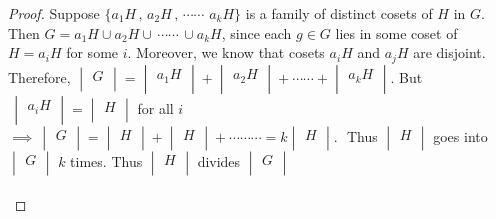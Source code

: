 \documentclass[11pt,a4paper]{article}
\theoremstyle{definition}
\begin{document}
\begin{proof}
Suppose $\{a_1H\, , \, a_2H\, , \, \cdots\cdots\, \, a_kH\}$ is a family of distinct cosets of $H$ in $G$. Then $G = a_1H\cup a_2H \cup\, \cdots\cdots\, \cup a_kH$, since each $g\in G$ lies in some coset of $H = a_iH$ for some $i$. Moreover, we know that cosets $a_i H$ and $a_jH$ are disjoint. Therefore, $\begin{vmatrix}
G\\
\end{vmatrix} = \begin{vmatrix}
a_1 H\\
\end{vmatrix} + \begin{vmatrix}
a_2 H\\
\end{vmatrix} + \cdots\cdots + \begin{vmatrix}
a_k H\\
\end{vmatrix}$. But $\, \begin{vmatrix}
a_i H\\
\end{vmatrix} = \begin{vmatrix}
H\\
\end{vmatrix}$ for all $i$
$\implies \, \begin{vmatrix}
G\\
\end{vmatrix} = \begin{vmatrix}
H\\
\end{vmatrix} + \begin{vmatrix}
H\\
\end{vmatrix} + \cdots\cdots\cdots  = k \begin{vmatrix}
H\\
\end{vmatrix}.\,\,$
Thus $\begin{vmatrix}
H\\
\end{vmatrix}$ goes into $\begin{vmatrix}
G\\
\end{vmatrix}\, \, k$ times. Thus $\begin{vmatrix}
H\\
\end{vmatrix}$ divides $\begin{vmatrix}
G\\
\end{vmatrix}$\\\\
\end{proof}
\end{document}

